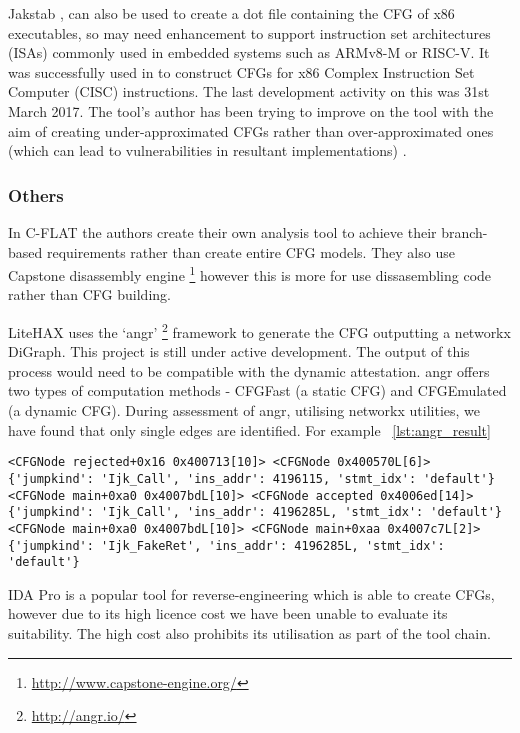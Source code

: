 Jakstab \cite{Kinder2008},\cite{Kinder2010} can also be used to create a dot file containing the CFG of x86 executables, so may need enhancement to support instruction set architectures (ISAs) commonly used in embedded systems such as ARMv8-M or RISC-V. It was successfully used in \cite{Nguyen2013} to construct CFGs for x86 Complex Instruction Set Computer (CISC) instructions. The last development activity on this was 31st March 2017. The tool's author has been trying to improve on the tool with the aim of creating under-approximated CFGs rather than over-approximated ones (which can lead to vulnerabilities in resultant implementations) \cite{Kinder2012}.

\subsubsection{Others}

In C-FLAT \cite{Abera2016} the authors create their own analysis tool to achieve their branch-based requirements rather than create entire CFG models. They also use Capstone disassembly engine \footnote{\url{http://www.capstone-engine.org/}} however this is more for use dissasembling code rather than CFG building.

LiteHAX \cite{Dessouky2018} uses the `angr' \footnote{\url{http://angr.io/}} \cite{Shoshitaishvili2016} framework to generate the CFG outputting a networkx \cite{Hagberg2008} DiGraph. This project is still under active development. The output of this process would need to be compatible with the dynamic attestation. angr offers two types of computation methods - CFGFast (a static CFG) and CFGEmulated (a dynamic CFG).
During assessment of angr, utilising networkx utilities, we have found that only single edges are identified. For example ~\ref{lst:angr_result}

\begin{lstlisting}[caption={Example of results from angr CFG analysis of fauxware in form of .edgelist output from networkx utilities},label={lst:angr_result}]
<CFGNode rejected+0x16 0x400713[10]> <CFGNode 0x400570L[6]> {'jumpkind': 'Ijk_Call', 'ins_addr': 4196115, 'stmt_idx': 'default'}
<CFGNode main+0xa0 0x4007bdL[10]> <CFGNode accepted 0x4006ed[14]> {'jumpkind': 'Ijk_Call', 'ins_addr': 4196285L, 'stmt_idx': 'default'}
<CFGNode main+0xa0 0x4007bdL[10]> <CFGNode main+0xaa 0x4007c7L[2]> {'jumpkind': 'Ijk_FakeRet', 'ins_addr': 4196285L, 'stmt_idx': 'default'}
\end{lstlisting}

IDA Pro is a popular tool for reverse-engineering which is able to create CFGs, however due to its high licence cost we have been unable to evaluate its suitability. The high cost also prohibits its utilisation as part of the tool chain.

